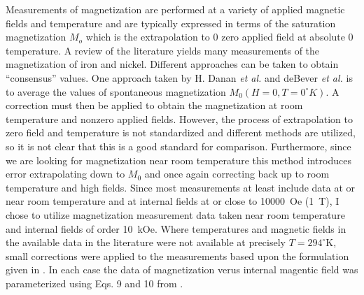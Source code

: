 \documentclass[12pt]{article}
\begin{document}
Measurements of magnetization are performed at a variety of applied magnetic fields and temperature and are typically expressed in terms of the saturation magnetization $M_o$ which is the extrapolation to 0 zero applied field at absolute 0 temperature\cite{Crangle1971}. A review of the literature yields many measurements of the magnetization of iron and nickel. Different approaches can be taken to obtain ``consensus'' values. One approach taken by H. Danan {\it et al.}\cite{Danan1968} and deBever {\it et al.} \cite{deBever1997} is to average the values of spontaneous magnetization $M_0(H=0, T=0^{\circ}K)$. A correction must then be applied to obtain the magnetization at room temperature and nonzero applied fields. However, the process of extrapolation to zero field and temperature is not standardized and different methods are utilized, so it is not clear that this is a good standard for comparison. Furthermore, since we are looking for magnetization near room temperature this method introduces error extrapolating down to $M_0$ and once again correcting back up to room temperature and high fields. Since most measurements at least include data at or near room temperature and at internal fields at or close to 10000~Oe (1~T), I chose to utilize magnetization measurement data taken near room temperature and internal fields of order 10~kOe. Where temperatures and magnetic fields in the available data in the literature were not available at precisely $T=294^{\circ}$K, small corrections were applied to the measurements based upon the formulation given in \cite{PauthenetMar1982}. In each case the data of magnetization verus internal magentic field was parameterized using Eqs. 9 and 10 from \cite{PauthenetMar1982}. 
\end{document}
